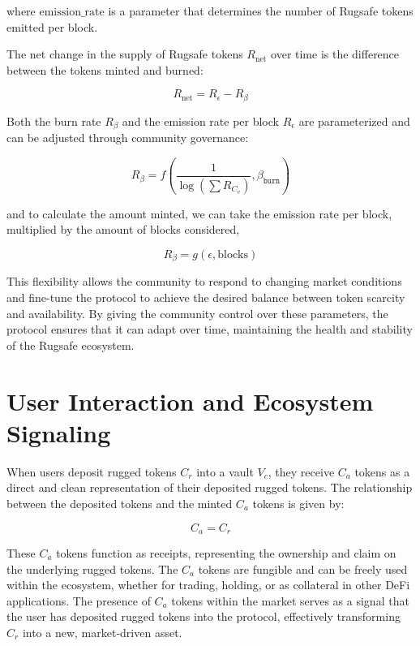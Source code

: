 \documentclass{article}
\begin{document}
where $\text{emission\_rate}$ is a parameter that determines the number of Rugsafe tokens emitted per block.

The net change in the supply of Rugsafe tokens $R_\text{net}$ over time is the difference between the tokens minted and burned:

\[
R_{\text{net}} = R_{\epsilon} - R_{\beta}
\]

Both the burn rate $R_{\beta}$ and the emission rate per block $R_\epsilon$ are parameterized and can be adjusted through community governance:

\[
R_\beta = f\left(\frac{1}{\log\left(\sum R_{C_v}\right)}, \beta_{\texttt{burn}}\right)
\]


and to calculate the amount minted, we can take the emission rate per block, multiplied by the amount of blocks considered,

\[
R_{\beta} = g(\epsilon, \text{blocks})
\]

This flexibility allows the community to respond to changing market conditions and fine-tune the protocol to achieve the desired balance between token scarcity and availability. By giving the community control over these parameters, the protocol ensures that it can adapt over time, maintaining the health and stability of the Rugsafe ecosystem.










\section{User Interaction and Ecosystem Signaling}
When users deposit rugged tokens $C_r$ into a vault $V_c$, they receive $C_a$ tokens as a direct and clean representation of their deposited rugged tokens. The relationship between the deposited tokens and the minted $C_a$ tokens is given by:

\[
C_a = C_r
\]

These $C_a$ tokens function as receipts, representing the ownership and claim on the underlying rugged tokens. The $C_a$ tokens are fungible and can be freely used within the ecosystem, whether for trading, holding, or as collateral in other DeFi applications. The presence of $C_a$ tokens within the market serves as a signal that the user has deposited rugged tokens into the protocol, effectively transforming $C_r$ into a new, market-driven asset.
\end{document}
